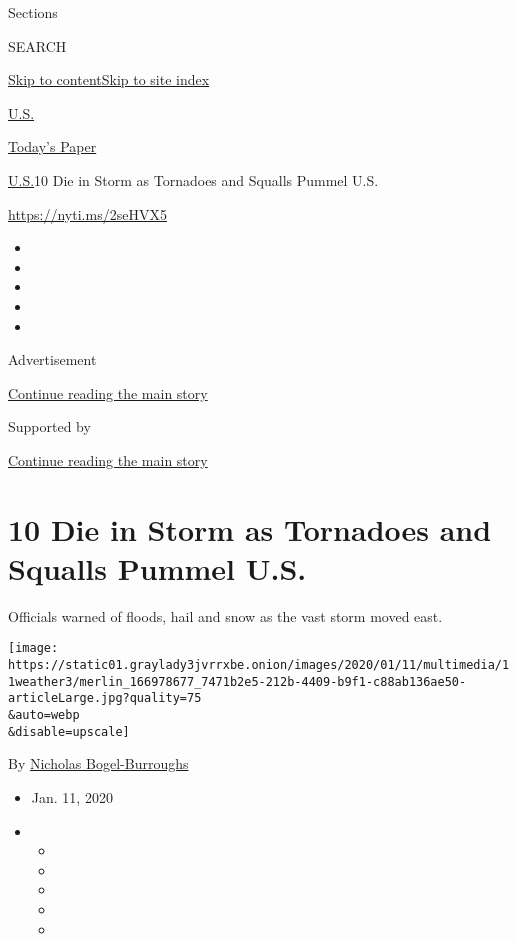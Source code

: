 Sections

SEARCH

\protect\hyperlink{site-content}{Skip to
content}\protect\hyperlink{site-index}{Skip to site index}

\href{https://www.nytimes3xbfgragh.onion/section/us}{U.S.}

\href{https://myaccount.nytimes3xbfgragh.onion/auth/login?response_type=cookie\&client_id=vi}{}

\href{https://www.nytimes3xbfgragh.onion/section/todayspaper}{Today's
Paper}

\href{/section/us}{U.S.}\textbar{}10 Die in Storm as Tornadoes and
Squalls Pummel U.S.

\url{https://nyti.ms/2seHVX5}

\begin{itemize}
\item
\item
\item
\item
\item
\end{itemize}

Advertisement

\protect\hyperlink{after-top}{Continue reading the main story}

Supported by

\protect\hyperlink{after-sponsor}{Continue reading the main story}

\hypertarget{10-die-in-storm-as-tornadoes-and-squalls-pummel-us}{%
\section{10 Die in Storm as Tornadoes and Squalls Pummel
U.S.}\label{10-die-in-storm-as-tornadoes-and-squalls-pummel-us}}

Officials warned of floods, hail and snow as the vast storm moved east.

\texttt{[image: https://static01.graylady3jvrrxbe.onion/images/2020/01/11/multimedia/11weather3/merlin\_166978677\_7471b2e5-212b-4409-b9f1-c88ab136ae50-articleLarge.jpg?quality=75\\\&auto=webp\\\&disable=upscale]}

By
\href{https://www.nytimes3xbfgragh.onion/by/nicholas-bogel-burroughs}{Nicholas
Bogel-Burroughs}

\begin{itemize}
\item
  Jan. 11, 2020
\item
  \begin{itemize}
  \item
  \item
  \item
  \item
  \item
  \end{itemize}
\end{itemize}

